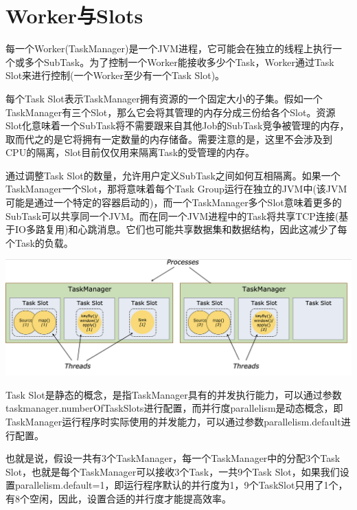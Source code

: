 \documentclass[oneside]{ctexbook}
\begin{document}
\section{Worker与Slots}

每一个Worker(TaskManager)是一个JVM进程，它可能会在独立的线程上执行一个或多个SubTask。为了控制一个Worker能接收多少个Task，Worker通过Task Slot来进行控制(一个Worker至少有一个Task Slot)。

每个Task Slot表示TaskManager拥有资源的一个固定大小的子集。假如一个TaskManager有三个Slot，那么它会将其管理的内存分成三份给各个Slot。资源Slot化意味着一个SubTask将不需要跟来自其他Job的SubTask竞争被管理的内存，取而代之的是它将拥有一定数量的内存储备。需要注意的是，这里不会涉及到CPU的隔离，Slot目前仅仅用来隔离Task的受管理的内存。

通过调整Task Slot的数量，允许用户定义SubTask之间如何互相隔离。如果一个TaskManager一个Slot，那将意味着每个Task Group运行在独立的JVM中(该JVM可能是通过一个特定的容器启动的)，而一个TaskManager多个Slot意味着更多的SubTask可以共享同一个JVM。而在同一个JVM进程中的Task将共享TCP连接(基于IO多路复用)和心跳消息。它们也可能共享数据集和数据结构，因此这减少了每个Task的负载。

\noindent \includegraphics[width=\textwidth]{tasks_slots.png}

Task Slot是静态的概念，是指TaskManager具有的并发执行能力，可以通过参数taskmanager.numberOfTaskSlots进行配置，而并行度parallelism是动态概念，即TaskManager运行程序时实际使用的并发能力，可以通过参数parallelism.default进行配置。

也就是说，假设一共有3个TaskManager，每一个TaskManager中的分配3个Task Slot，也就是每个TaskManager可以接收3个Task，一共9个Task Slot，如果我们设置parallelism.default=1，即运行程序默认的并行度为1，9个TaskSlot只用了1个，有8个空闲，因此，设置合适的并行度才能提高效率。
\end{document}

